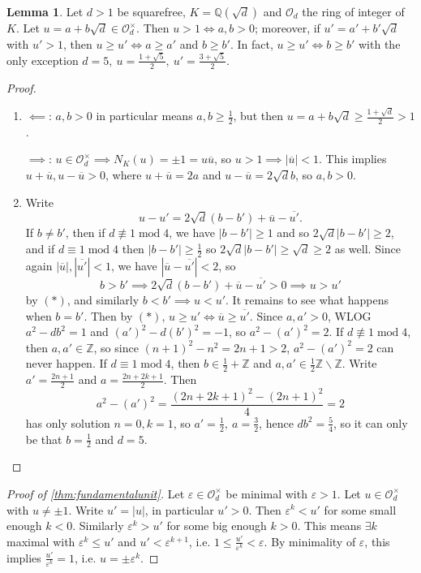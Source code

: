 \documentclass{article}
\newcommand{\Z}{\mathbb{Z}}
\newcommand{\Q}{\mathbb{Q}}
\newcommand{\Mod}{\operatorname{mod}}
\newcommand{\ri}{\mathcal{O}}
\theoremstyle{definition}
\newtheorem{lemma}[defn]{Lemma}
\begin{document}
\begin{lemma}
Let $d>1$ be squarefree, $K=\Q\left(\sqrt d\right)$ and $\ri_d$ the ring of integer of $K$. Let $u=a+b\sqrt d\in\ri_d^\times$. Then $u>1\iff a,b>0$; moreover, if $u'=a'+b'\sqrt d$ with $u'>1$, then $u\geq u'\iff a\geq a'$ and $b\geq b'$. In fact, $u\geq u'\iff b\geq b'$ with the only exception $d=5,\ u=\frac{1+\sqrt 5}{2},\ u'=\frac{3+\sqrt 5}{2}$.
\end{lemma}
\begin{proof}
\begin{enumerate}
\item $\impliedby$: $a,b>0$ in particular means $a,b\geq\frac12$, but then $u=a+b\sqrt d\geq\frac{1+\sqrt d}{2}>1$.

$\implies$: $u\in\ri_d^\times\implies N_K(u)=\pm 1=u\overline u$, so $u>1\implies |\overline u|<1$. This implies $u+\overline u,u-\overline u>0$, where $u+\overline u=2a$ and $u-\overline u=2\sqrt db$, so $a,b>0$.

\item Write
\[
\tag{\ast}
u-u'=2\sqrt d(b-b')+\overline u-\overline{u'}.
\]
If $b\neq b'$, then if $d\not\equiv 1\Mod 4$, we have $|b-b'|\geq 1$ and so $2\sqrt d|b-b'|\geq 2$, and if $d\equiv 1\Mod 4$ then $|b-b'|\geq\frac12$ so $2\sqrt d|b-b'|\geq\sqrt d\geq 2$ as well. Since again $|\overline u|,|\overline{u'}|<1$, we have $|\overline u-\overline{u'}|<2$, so
\[
b>b'\implies 2\sqrt d(b-b')+\overline u-\overline{u'}>0\implies u>u'
\]
by $(\ast)$, and similarly $b<b'\implies u<u'$. It remains to see what happens when $b=b'$. Then by $(\ast)$, $u\geq u'\iff \overline{u}\geq\overline{u'}$. Since $a,a'>0$, WLOG $a^2-db^2=1$ and $(a')^2-d(b')^2=-1$, so $a^2-(a')^2=2$. If $d\not\equiv 1\Mod 4$, then $a,a'\in\Z$, so since $(n+1)^2-n^2=2n+1>2$, $a^2-(a')^2=2$ can never happen. If $d\equiv 1\Mod 4$, then $b\in\frac12+\Z$ and $a,a'\in\frac12\Z\backslash\Z$. Write $a'=\frac{2n+1}{2}$ and $a=\frac{2n+2k+1}{2}$. Then
\[
a^2-(a')^2=\frac{(2n+2k+1)^2-(2n+1)^2}{4}=2
\]
has only solution $n=0,k=1$, so $a'=\frac12,\ a=\frac32$, hence $db^2=\frac{5}{4}$, so it can only be that $b=\frac12$ and $d=5$.
\end{enumerate}
\end{proof}

\begin{proof}[Proof of \ref{thm:fundamentalunit}]
Let $\varepsilon\in\ri_d^\times$ be minimal with $\varepsilon>1$. Let $u\in\ri_d^\times$ with $u\neq\pm 1$. Write $u'=|u|$, in particular $u'>0$. Then $\varepsilon^k<u'$ for some small enough $k<0$. Similarly $\varepsilon^k>u'$ for some big enough $k>0$. This means $\exists k$ maximal with $\varepsilon^k\leq u'$ and $u'<\varepsilon^{k+1}$, i.e. $1\leq\frac{u'}{\varepsilon^k}<\varepsilon$. By minimality of $\varepsilon$, this implies $\frac{u'}{\varepsilon^k}=1$, i.e. $u=\pm\varepsilon^k$.
\end{proof}
\end{document}
